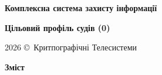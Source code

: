\documentclass{article}
\newcommand\HUGE[1]{\fontsize{40}{40}\selectfont #1}
\begin{document}
\pagestyle{fancy}

\begin{titlepage}
  \AddToShipoutPictureBG*{\AtPageLowerLeft{\color{nato}\rule{\paperwidth}{\paperheight}}}
  \color{white}\thispagestyle{empty}\vspace*{4cm}\centering
  {\Huge  \textbf{Комплексна система захисту інформації} \par} \vspace{2cm}
  {\HUGE  \textbf{Цільовий профіль судів (0)} \par} \vspace{2.5cm}
  \vfill
  {\large 2026 \copyright\ Критпографічні Телесистеми \par}
\end{titlepage}

\newpage

\begin{center}
  {\Huge\color{nato}\bfseries Зміст\par}
\end{center}
\vspace{40pt}
\tableofcontents

\begin{abstract}
Цільовий профіль безпеки (ЦПБ) — індивідуальний для конкретної системи підприємства. Саме на його основі створюється/модернізується КЗЗІ. Включає лише додаткові вимоги (відмінності) відносно Галузевого профілю.
\end{abstract}
\end{document}
